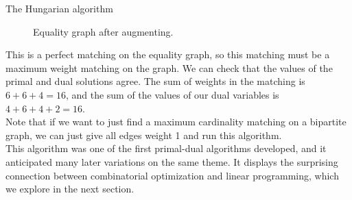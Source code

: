 \begin{section}{The Hungarian algorithm}
\begin{figure}[H]
		\caption{Equality graph after augmenting.}
	\end{figure}
	This is a perfect matching on the equality graph, so this matching must be a maximum weight 
	matching on the graph. We can check that the values of the primal and dual solutions agree. 
	The sum of weights in the matching is $6+6+4 = 16$, and the sum of the values of our 
	dual variables is $4+6+4+2 = 16$.\\
	Note that if we want to just find a maximum cardinality matching on a bipartite graph, 
	we can just give all edges weight 1 and run this algorithm.\\
	This algorithm was one of the first primal-dual algorithms developed, and it anticipated many 
	later variations on the same theme. It displays the surprising connection between combinatorial 
	optimization and linear programming, which we explore in the next section.
\end{section}
